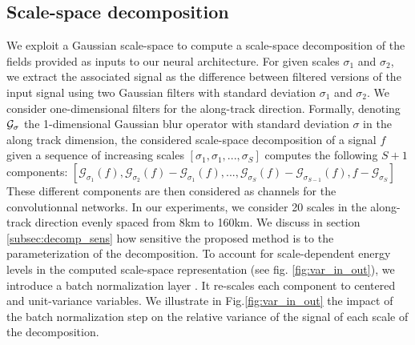 \begin{bibunit}
 
\subsection{Scale-space decomposition}
\label{subsec:scale_decomp}


We exploit a Gaussian scale-space to compute a scale-space decomposition of the fields provided as inputs to our neural architecture. For given scales $\sigma_1$ and $\sigma_2$, we extract the associated signal as the difference between filtered versions of the input signal using two Gaussian filters with standard deviation $\sigma_1$ and $\sigma_2$. We consider one-dimensional filters for the along-track direction. Formally, denoting 
 $\cal{G_{\sigma}}$ the 1-dimensional Gaussian blur operator with standard deviation $\sigma$ in the along track dimension, the considered scale-space decomposition of a signal $f$ given a sequence of increasing scales $[\sigma_1, \sigma_1, ..., \sigma_S]$ computes the following $S+1$ components: $[\mathcal{G}_{\sigma_1}(f), \mathcal{G}_{\sigma_2}(f) - \mathcal{G}_{\sigma_1}(f),...,\mathcal{G}_{\sigma_S}(f) - \mathcal{G}_{\sigma_{S-1}}(f), f - \mathcal{G}_{\sigma_S}]$
These different components are then considered as channels for the convolutionnal networks. In our experiments, we consider 20 scales in the along-track direction evenly spaced from 8km to 160km. We discuss in section \ref{subsec:decomp_sens} how sensitive the proposed method is to the parameterization of the decomposition.
To account for scale-dependent energy levels in the computed scale-space representation (see fig. \ref{fig:var_in_out}), we introduce a batch normalization layer \cite{Ioffe_Szegedy_2015}. It re-scales each component to centered and unit-variance variables.
We illustrate in Fig.\ref{fig:var_in_out} the impact of the batch normalization step on the relative variance of the signal of each scale of the decomposition.


\end{bibunit}
